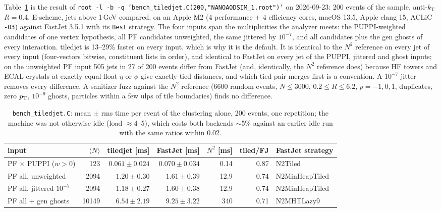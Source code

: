 Table~\ref{tab:bench} is the result of
\texttt{root -l -b -q 'bench\_tiledjet.C(200,"NANOAODSIM\_1.root")'} on
2026-09-23: 200 events of the sample, anti-$k_{\mathrm T}$ $R=0.4$, E-scheme,
jets above 1\,GeV compared, on an Apple M2 (4 performance + 4 efficiency
cores, macOS 13.5, Apple clang 15, ACLiC \texttt{-O3}) against FastJet 3.5.1
with its \texttt{Best} strategy. The four inputs span the multiplicities the
analyzer meets: the PUPPI-weighted candidates of one vertex hypothesis, all PF
candidates unweighted, the same jittered by $10^{-7}$, and all candidates plus
the gen ghosts of every interaction. tiledjet is 13--29\% faster on every
input, which is why it is the default. It is identical to the $N^2$ reference
on every jet of every input (four-vectors bitwise, constituent lists in order),
and identical to FastJet on every jet of the PUPPI, jittered and ghost inputs;
on the unweighted PF input 505 jets in 27 of 200 events differ from FastJet
(and, identically, the $N^2$ reference does) because HF towers and ECAL
crystals at exactly equal float $\eta$ or $\phi$ give exactly tied distances,
and which tied pair merges first is a convention. A $10^{-7}$ jitter removes
every difference. A sanitizer fuzz against the $N^2$ reference (6600 random
events, $N \le 3000$, $0.2 \le R \le 6.2$, $p = -1, 0, 1$, duplicates, zero
$p_{\mathrm{T}}$, $10^{-9}$ ghosts, particles within a few ulps of tile boundaries) finds
no difference.

\begin{table}[htbp]
\centering
\caption{\texttt{bench\_tiledjet.C}: mean $\pm$ rms time per event of the
clustering alone, 200 events, one repetition; the machine was not otherwise
idle (load $\approx 4$--5), which costs both backends $\sim$5\% against an
earlier idle run with the same ratios within 0.02.}
\label{tab:bench}
\small
\begin{tabular}{lrrrrrl}
\toprule
input & $\langle N\rangle$ & tiledjet [ms] & FastJet [ms] & $N^2$ [ms] & tiled/FJ & FastJet strategy \\
\midrule
PF $\times$ PUPPI ($w>0$)  &   123 & $0.061\pm0.024$ & $0.070\pm0.034$ &  0.14 & 0.87 & N2Tiled \\
PF all, unweighted         &  2094 & $1.20\pm0.30$   & $1.61\pm0.39$   & 12.9  & 0.74 & N2MinHeapTiled \\
PF all, jittered $10^{-7}$ &  2094 & $1.18\pm0.27$   & $1.60\pm0.38$   & 12.9  & 0.74 & N2MinHeapTiled \\
PF all + gen ghosts        & 10149 & $6.54\pm2.19$   & $9.25\pm3.22$   & 340   & 0.71 & N2MHTLazy9 \\
\bottomrule
\end{tabular}
\end{table}
